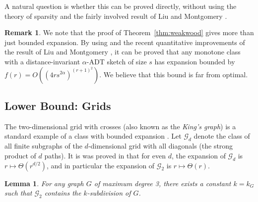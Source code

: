 \documentclass[11pt]{article}
\newtheorem{lemma}[thm]{Lemma}
\theoremstyle{definition}
\newtheorem{rem}[thm]{Remark}
\begin{document}
\noindent
A natural question is whether this can be proved directly, without using the theory of sparsity and
the fairly involved result of Liu and Montgomery \cite{LM20}.

\begin{rem}
We note that the proof of Theorem~\ref{thm:weakwood} gives more than
just
bounded expansion. By using \cite[Theorem 11]{Dvo08} and the recent
quantitative improvements \cite{FHL+22,LTW+22} of the result of Liu and
Montgomery \cite{LM20}, it can be proved that any monotone class with a
distance-invariant 
$\alpha$-ADT sketch of size $s$ has expansion bounded by $f(r)=
O((4rs^{2\alpha})^{(r+1)^2})$. We believe that this bound is far from optimal.
\end{rem}

\subsection{Lower Bound: Grids}

The two-dimensional grid with crosses (also known as the \emph{King's graph}) is a standard example of a class with bounded expansion
\cite{NOW12}.  Let $\mathcal{G}_d$ denote the class of all finite subgraphs of the $d$-dimensional
grid with all diagonals (the strong product of $d$ paths).  It is was proved in \cite{Dvo21} that
for even $d$, the expansion of $\mathcal{G}_d$ is $r\mapsto\Theta(r^{d/2})$, and in particular the
expansion of $\mathcal{G}_2$ is $r\mapsto\Theta(r)$.

\begin{lemma}\label{lem:grid}
For any graph $G$ of maximum degree 3, there exists a constant $k=k_G$ such
that $\mathcal{G}_2$ contains the $k$-subdivision of $G$.
\end{lemma}
\end{document}
